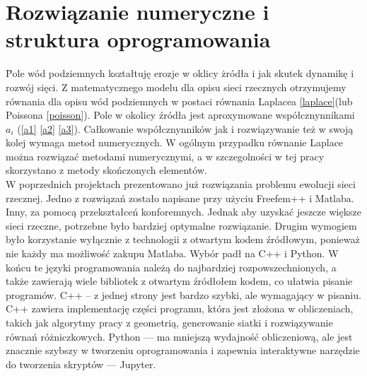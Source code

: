 \documentclass[]{pracamgr}
\begin{document}
  \chapter{Rozwiązanie numeryczne i struktura oprogramowania}

    \hspace{1em} \= 
    Pole wód podziemnych kształtuję erozje w oklicy żródła i jak skutek dynamikę i rozwój sięci. Z matematycznego modelu dla opisu sieci rzecznych otrzymujemy równania dla opisu wód podziemnych w postaci równania Laplacea \ref{laplace}(lub Poissona \ref{poisson}). Pole w okolicy źródła jest aproxymowane współcznynnikami $a_i$ (\ref{a1} \ref{a2} \ref{a3}). Całkowanie współcznynników jak i rozwiązywanie też w swoją kolej wymaga metod numerycznych. W ogólnym przypadku równanie Laplace można rozwiązać metodami numerycznymi, a w szczegolności w tej pracy skorzystano z metody skończonych elementów. \\ \indent
    W poprzednich projektach prezentowano już rozwiązania problemu ewolucji sieci rzecznej. Jedno z rozwiązań zostało napisane przy użyciu Freefem++ i Matlaba. Inny, za pomocą przekształceń konforemnych. Jednak aby uzyskać jeszcze większe sieci rzeczne, potrzebne było bardziej optymalne rozwiązanie. Drugim wymogiem było korzystanie wyłącznie z technologii z otwartym kodem źródłowym, ponieważ nie każdy ma możliwość zakupu Matlaba. Wybór padł na C++\cite{Stroustrup1997} i Python\cite{python3}. W końcu te języki programowania należą do najbardziej rozpowszechnionych, a także zawierają wiele bibliotek z otwartym źródłołem kodem, co ułatwia pisanie programów. C++ -- z jednej strony jest bardzo szybki, ale wymagający w pisaniu. C++ zawiera implementację części programu, która jest złożona w obliczeniach, takich jak algorytmy pracy z geometrią, generowanie siatki i rozwiązywanie równań różniczkowych. Python — ma mniejszą wydajność obliczeniową, ale jest znacznie szybszy w tworzeniu oprogramowania i zapewnia interaktywne narzędzie do tworzenia skryptów — Jupyter.
\end{document}
